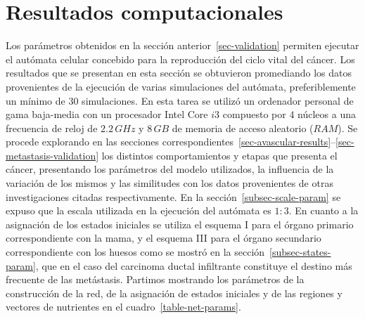\chapter{Resultados computacionales}
\label{sec-results}
Los par\'ametros obtenidos en la secci\'on anterior~\ref{sec-validation} permiten ejecutar el aut\'omata celular concebido para la reproducci\'on del ciclo vital del c\'ancer. Los resultados que se presentan en esta secci\'on se obtuvieron promediando los datos provenientes de la ejecuci\'on de varias simulaciones del aut\'omata, preferiblemente un m\'inimo de $30$ simulaciones. En esta tarea se utiliz\'o un ordenador personal de gama baja-media con un procesador Intel Core $i3$ compuesto por $4$ n\'ucleos a una frecuencia de reloj de $2$.$2\,GHz$ y $8\,GB$ de memoria de acceso aleatorio ($RAM$). Se procede explorando en las secciones correspondientes~\ref{sec-avascular-results}--\ref{sec-metastasis-validation} los distintos comportamientos y etapas que presenta el c\'ancer, presentando los par\'ametros del modelo utilizados, la influencia de la variaci\'on de los mismos y las similitudes con los datos provenientes de otras investigaciones citadas respectivamente. En la secci\'on~\ref{subsec-scale-param} se expuso que la escala utilizada en la ejecuci\'on del aut\'omata es $1:3$. En cuanto a la asignaci\'on de los estados iniciales se utiliza el esquema I para el \'organo primario correspondiente con la mama, y el esquema III para el \'organo secundario correspondiente con los huesos como se mostr\'o en la secci\'on~\ref{subsec-states-param}, que en el caso del carcinoma ductal infiltrante constituye el destino m\'as frecuente de las met\'astasis. Partimos mostrando los par\'ametros de la construcci\'on de la red, de la asignaci\'on de estados iniciales y de las regiones y vectores de nutrientes en el cuadro~\ref{table-net-params}. 

